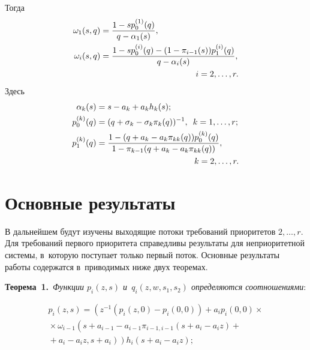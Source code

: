 \begin{multicols}{2}
\noindent
Тогда
\begin{align*}
\omega_1(s,q)&=\fr{1-sp_0^{(1)}(q)}{q-\alpha_1(s)},\\
\omega_i(s,q)&=\fr{1-sp_0^{(i)}(q)-(1-\pi_{i-1}(s))p_1^{(i)}(q)}{q-\alpha_i(s)},\\
&\hspace*{40mm} i=2,\ldots,r.
\end{align*}
Здесь
\begin{align*}
\alpha_k(s)&=s-a_k+a_kh_k(s);\\
 p_0^{(k)}(q)&=(q+\sigma_k-\sigma_k\pi_k(q))^{-1},\enskip k=1,\ldots,r;\\
p_1^{(k)}(q)&=\fr{1-(q+a_k-a_k\pi_{kk}(q))p_0^{(k)}(q)}{1-\pi_{k-1}(q+a_k-a_k\pi_{kk}(q))},\\ 
&\hspace*{41mm}k=2,\ldots,r.
\end{align*}

\vspace*{-16pt}


\section{Основные результаты}

\vspace*{-2pt}


В дальнейшем будут изучены выходящие потоки требований приоритетов $2,\ldots,r.$ 
Для требований первого приоритета справедливы результаты
для неприоритетной системы, в~которую поступает только первый поток.
Основные результаты работы содержатся в~приводимых ниже двух теоремах.


\smallskip

\noindent
\textbf{Теорема~1.}\
\textit{Функции $p_i\left(z,s\right)$ и~$q_i\left(z,w,s_1,s_2\right)$ определяются соотношениями}:

\vspace*{-6pt}

\noindent
\begin{multline}
\label{n4}
p_i\left(z,s\right)=\left(z^{-1}\left(p_i(z,0)-p_i(0,0)\right)+a_ip_i(0,0)\times{}\right.\\
{}\times\left.\omega_{i-1}\left(s+a_{i-1}-a_{i-1}\pi_{i-1,i-1}\left(s+a_i-a_iz\right)+{}\right.\right.\\
\left.\left.{}+a_i-a_iz,s+a_i\right)
\right)h_i\left(s+a_i-a_iz\right);
\end{multline}

\vspace*{-14pt}


\end{multicols}
